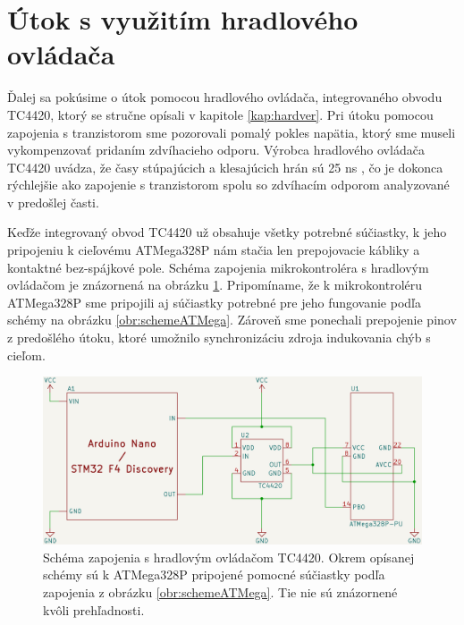 \section{Útok s využitím hradlového ovládača}
Ďalej sa pokúsime o útok pomocou hradlového ovládača, integrovaného obvodu TC4420, ktorý se stručne opísali v kapitole \ref{kap:hardver}. Pri útoku pomocou zapojenia s tranzistorom sme pozorovali pomalý pokles napätia, ktorý sme museli vykompenzovať pridaním zdvíhacieho odporu. Výrobca hradlového ovládača TC4420 uvádza, že časy stúpajúcich a klesajúcich hrán sú 25 ns \cite{gateDriver}, čo je dokonca rýchlejšie ako zapojenie s tranzistorom spolu so zdvíhacím odporom analyzované v predošlej časti.

Keďže integrovaný obvod TC4420 už obsahuje všetky potrebné súčiastky, k jeho pripojeniu k cieľovému ATMega328P nám stačia len prepojovacie kábliky a kontaktné bez-spájkové pole. Schéma zapojenia mikrokontroléra s hradlovým ovládačom je znázornená na obrázku \ref{obr:schemeGateDriver}. Pripomíname, že k mikrokontroléru ATMega328P sme pripojili aj súčiastky potrebné pre jeho fungovanie podľa schémy na obrázku \ref{obr:schemeATMega}. Zároveň sme ponechali prepojenie pinov z predošlého útoku, ktoré umožnilo synchronizáciu zdroja indukovania chýb s cieľom.

\begin{figure}
    \centerline{\includegraphics[width=1\textwidth]{images/schemeGateDriver.png}}
    \caption[Schéma zapojenia s hradlovým ovládačom TC4420]{Schéma zapojenia s hradlovým ovládačom TC4420. Okrem opísanej schémy sú k ATMega328P pripojené pomocné súčiastky podľa zapojenia z obrázku \ref{obr:schemeATMega}. Tie nie sú znázornené kvôli prehľadnosti.}
    \label{obr:schemeGateDriver}
\end{figure}


